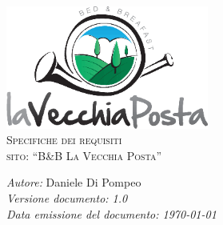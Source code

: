 \documentclass[a4paper,12pt,hidelinks]{report}
\begin{document}
\begin{titlepage}
  \begin{center}
    \includegraphics[width=0.5\textwidth,keepaspectratio=true]{img/logo}\\[1cm]    
    \textsc{\LARGE Specifiche dei requisiti}\\[0.6cm]
    \textsc{\LARGE  sito: ``B\&B La Vecchia Posta''}\\ [2.0cm]

    \begin{minipage}{0.8\textwidth}
      \begin{flushleft} \large
	\emph{Autore:} Daniele Di Pompeo \\[0.5cm]
	\emph{Versione documento: 1.0}\\[0.5cm]
	\emph{Data emissione del documento: \today}\\[0.5cm]
      \end{flushleft}
    \end{minipage}
  \end{center}
\end{titlepage}

\tableofcontents
\end{document}
